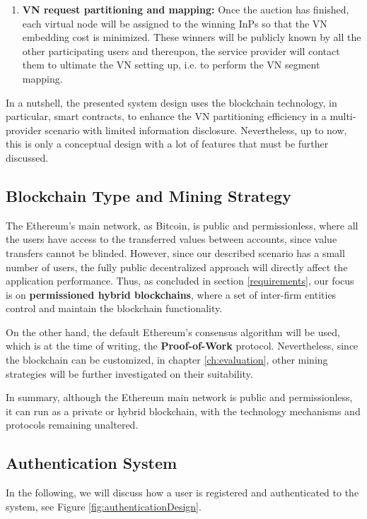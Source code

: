 \begin{enumerate}
 	\item \textbf{VN request partitioning and mapping:} Once the auction has finished, each virtual node will be assigned to the winning InPs so that the VN embedding cost is minimized. These winners will be publicly known by all the other participating users and thereupon, the service provider will contact them to ultimate the VN setting up, i.e. to perform the VN segment mapping.
\end{enumerate}

In a nutshell, the presented system design uses the blockchain technology, in particular, smart contracts, to enhance the VN partitioning efficiency in a multi-provider scenario with limited information disclosure. Nevertheless, up to now, this is only a conceptual design with a lot of features that must be further discussed.

\subsection{Blockchain Type and Mining Strategy}

The Ethereum's main network, as Bitcoin, is public and permissionless, where all the users have access to the transferred values between accounts, since value transfers cannot be blinded. However, since our described scenario has a small number of users, the fully public decentralized approach will directly affect the application performance. Thus, as concluded in section \ref{requirements}, our focus is on \textbf{permissioned hybrid blockchains}, where a set of inter-firm entities control and maintain the blockchain functionality.

On the other hand, the default Ethereum's consensus algorithm will be used, which is at the time of writing, the \textbf{Proof-of-Work} protocol. Nevertheless, since the blockchain can be customized, in chapter \ref{ch:evaluation}, other mining strategies will be further investigated on their suitability.

In summary, although the Ethereum main network is public and permissionless, it can run as a private or hybrid blockchain, with the technology mechanisms and protocols remaining unaltered.

\subsection{Authentication System} \label{authenticationSystem}

In the following, we will discuss how a user is registered and authenticated to the system, see Figure \ref{fig:authenticationDesign}.

